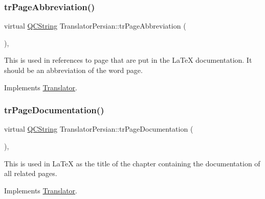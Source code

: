\mbox{\label{class_translator_persian_aa8ad3161043decd8a31b14be69f42947}} 
\subsubsection{\texorpdfstring{trPageAbbreviation()}{trPageAbbreviation()}}
{\footnotesize\ttfamily virtual \mbox{\hyperlink{class_q_c_string}{Q\+C\+String}} Translator\+Persian\+::tr\+Page\+Abbreviation (\begin{DoxyParamCaption}{ }\end{DoxyParamCaption})\hspace{0.3cm}{\ttfamily [inline]}, {\ttfamily [virtual]}}

This is used in references to page that are put in the La\+TeX documentation. It should be an abbreviation of the word page. 

Implements \mbox{\hyperlink{class_translator}{Translator}}.

\mbox{\label{class_translator_persian_acc91af71a4c5035221501d5738b25387}} 
\subsubsection{\texorpdfstring{trPageDocumentation()}{trPageDocumentation()}}
{\footnotesize\ttfamily virtual \mbox{\hyperlink{class_q_c_string}{Q\+C\+String}} Translator\+Persian\+::tr\+Page\+Documentation (\begin{DoxyParamCaption}{ }\end{DoxyParamCaption})\hspace{0.3cm}{\ttfamily [inline]}, {\ttfamily [virtual]}}

This is used in La\+TeX as the title of the chapter containing the documentation of all related pages. 

Implements \mbox{\hyperlink{class_translator}{Translator}}.

\mbox{\label{class_translator_persian_a88687d733e667370e5c07d04c3997d9d}} 
